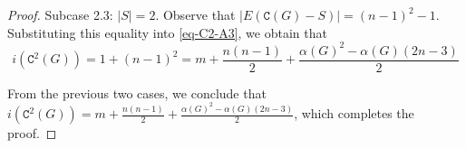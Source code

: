 \documentclass[10pt,a4paper]{amsart}
\begin{document}
\begin{proof}
\vspace{.2cm}

\noindent
Subcase 2.3: $|S| = 2$. Observe that $|E(\mathtt{C}(G)-S)| = (n-1)^{2} - 1$. Substituting this equality into \eqref{eq-C2-A3}, we obtain that
\begin{equation*}
i(\mathtt{C}^{2}(G)) = 1 + (n-1)^{2}=   m + \frac{n(n-1)}{2} + \frac{\alpha(G)^{2} -\alpha(G) (2n-3)}{2}
\end{equation*}

\vspace{.25cm}

\noindent
From the previous two cases, we conclude that $i(\mathtt{C}^{2}(G)) = m + \frac{n(n-1)}{2} + \frac{\alpha(G)^{2} -\alpha(G) (2n-3)}{2}$, which completes the proof.
\end{proof}
\end{document}
